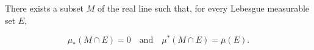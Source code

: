 There exists a subset $M$ of the real line such that, for every Lebesgue measurable set $E$,

$$\mu_*(M \cap E) = 0 \quad \text{and} \quad \mu^*(M \cap E) = \bar{\mu}(E).$$
